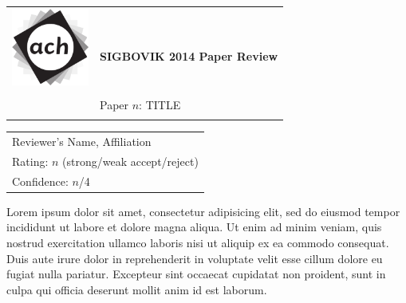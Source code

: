 \documentclass[12pt]{article}
\begin{document}
{\sffamily
\begin{tabular}{ll}
\multirow{2}{*}{\includegraphics[width=1in]{ach.png}}\\
& \textbf{\Huge{SIGBOVIK 2014 Paper Review}} \\ &\\
& \LARGE{Paper $n$: TITLE} \\
&\\
\hline
\end{tabular}}
\vspace{2em}

{\large\bf
\begin{tabular}{l}
Reviewer's Name, Affiliation \\
Rating: $n$ (strong/weak accept/reject) \\
Confidence: $n$/4 \\
\end{tabular}}
\vspace{1em}

Lorem ipsum dolor sit amet, consectetur adipisicing elit, sed do eiusmod tempor
incididunt ut labore et dolore magna aliqua. Ut enim ad minim veniam, quis
nostrud exercitation ullamco laboris nisi ut aliquip ex ea commodo consequat.
Duis aute irure dolor in reprehenderit in voluptate velit esse cillum dolore eu
fugiat nulla pariatur. Excepteur sint occaecat cupidatat non proident, sunt in
culpa qui officia deserunt mollit anim id est laborum.
\end{document}
